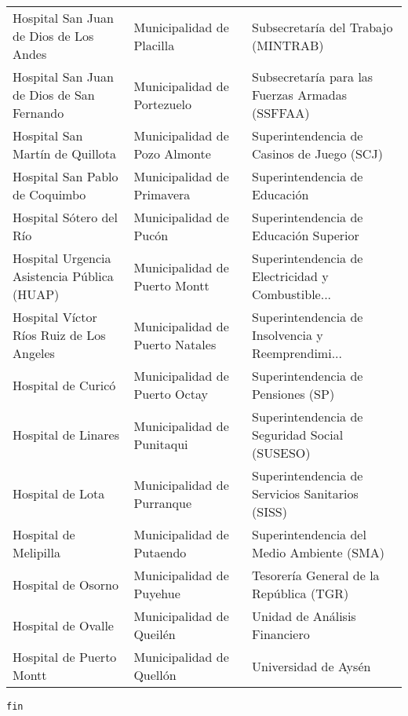 \documentclass[11pt]{article}
\begin{document}
\begin{longtable}{ p{5cm} | p{5cm} | p{5cm} }
            Hospital San Juan de Dios de Los Andes &                          Municipalidad de Placilla &                Subsecretaría del Trabajo (MINTRAB) \\
         Hospital San Juan de Dios de San Fernando &                        Municipalidad de Portezuelo &    Subsecretaría para las Fuerzas Armadas (SSFFAA) \\
                   Hospital San Martín de Quillota &                      Municipalidad de Pozo Almonte &         Superintendencia de Casinos de Juego (SCJ) \\
                    Hospital San Pablo de Coquimbo &                         Municipalidad de Primavera &                      Superintendencia de Educación \\
                           Hospital Sótero del Río &                             Municipalidad de Pucón &             Superintendencia de Educación Superior \\
       Hospital Urgencia Asistencia Pública (HUAP) &                      Municipalidad de Puerto Montt &  Superintendencia de Electricidad y Combustible... \\
          Hospital Víctor Ríos Ruiz de Los Angeles &                    Municipalidad de Puerto Natales &  Superintendencia de Insolvencia y Reemprendimi... \\
                                Hospital de Curicó &                      Municipalidad de Puerto Octay &                 Superintendencia de Pensiones (SP) \\
                               Hospital de Linares &                         Municipalidad de Punitaqui &      Superintendencia de Seguridad Social (SUSESO) \\
                                  Hospital de Lota &                         Municipalidad de Purranque &    Superintendencia de Servicios Sanitarios (SISS) \\
                             Hospital de Melipilla &                          Municipalidad de Putaendo &          Superintendencia del Medio Ambiente (SMA) \\
                                Hospital de Osorno &                           Municipalidad de Puyehue &            Tesorería General de la República (TGR) \\
                                Hospital de Ovalle &                           Municipalidad de Queilén &                      Unidad de Análisis Financiero \\
                          Hospital de Puerto Montt &                           Municipalidad de Quellón &                               Universidad de Aysén \\
\end{longtable}

    
    \begin{Verbatim}[commandchars=\\\{\}]
fin
    \end{Verbatim}


    
    
    
\end{document}
